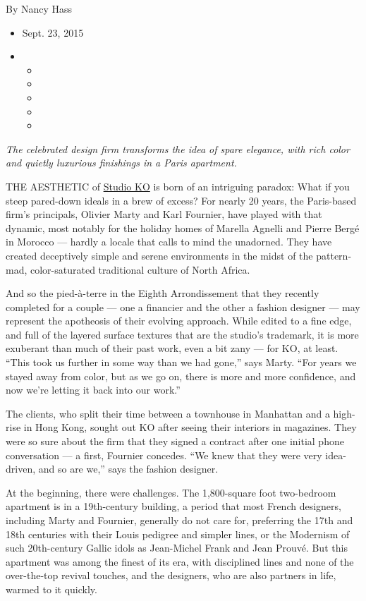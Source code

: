 By Nancy Hass

\begin{itemize}
\item
  Sept. 23, 2015
\item
  \begin{itemize}
  \item
  \item
  \item
  \item
  \item
  \end{itemize}
\end{itemize}

\emph{The celebrated design firm transforms the idea of spare elegance,
with rich color and quietly luxurious finishings in a Paris apartment.}

THE AESTHETIC of \href{http://www.studioko.fr/\#en-intro}{Studio KO} is
born of an intriguing paradox: What if you steep pared-down ideals in a
brew of excess? For nearly 20 years, the Paris-based firm's principals,
Olivier Marty and Karl Fournier, have played with that dynamic, most
notably for the holiday homes of Marella Agnelli and Pierre Bergé in
Morocco --- hardly a locale that calls to mind the unadorned. They have
created deceptively simple and serene environments in the midst of the
pattern-mad, color-saturated traditional culture of North Africa.

And so the pied-à-terre in the Eighth Arrondissement that they recently
completed for a couple --- one a financier and the other a fashion
designer --- may represent the apotheosis of their evolving approach.
While edited to a fine edge, and full of the layered surface textures
that are the studio's trademark, it is more exuberant than much of their
past work, even a bit zany --- for KO, at least. ``This took us further
in some way than we had gone,'' says Marty. ``For years we stayed away
from color, but as we go on, there is more and more confidence, and now
we're letting it back into our work.''

The clients, who split their time between a townhouse in Manhattan and a
high-rise in Hong Kong, sought out KO after seeing their interiors in
magazines. They were so sure about the firm that they signed a contract
after one initial phone conversation --- a first, Fournier concedes.
``We knew that they were very idea-driven, and so are we,'' says the
fashion designer.

At the beginning, there were challenges. The 1,800-square foot
two-bedroom apartment is in a 19th-century building, a period that most
French designers, including Marty and Fournier, generally do not care
for, preferring the 17th and 18th centuries with their Louis pedigree
and simpler lines, or the Modernism of such 20th-century Gallic idols as
Jean-Michel Frank and Jean Prouvé. But this apartment was among the
finest of its era, with disciplined lines and none of the over-the-top
revival touches, and the designers, who are also partners in life,
warmed to it quickly.


